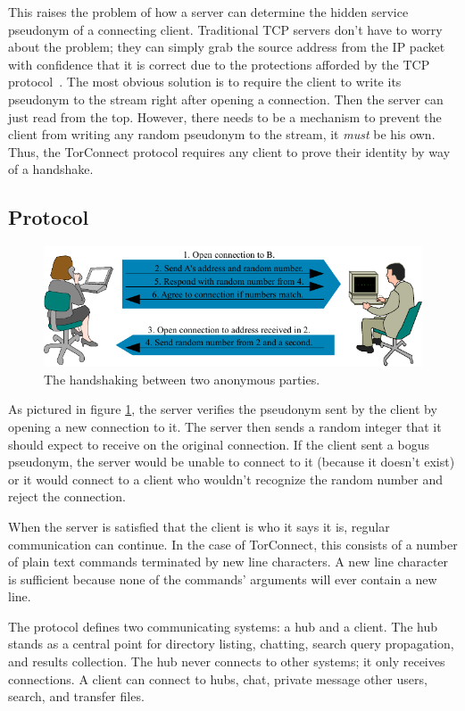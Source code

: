 \documentclass{article}
\begin{document}
This raises the problem of how a server can determine the hidden service pseudonym of a connecting client.  Traditional TCP servers don't have to worry about the problem; they can simply grab the source address from the IP packet with confidence that it is correct due to the protections afforded by the TCP protocol~\cite{wiki-spoofing}.  The most obvious solution is to require the client to write its pseudonym to the stream right after opening a connection.  Then the server can just read from the top.  However, there needs to be a mechanism to prevent the client from writing any random pseudonym to the stream, it \emph{must} be his own.  Thus, the TorConnect protocol requires any client to prove their identity by way of a handshake.

\subsection{Protocol}
\begin{figure}
\centering
\includegraphics{handshake.pdf}
\caption{The handshaking between two anonymous parties.}
\label{fig:handshake}
\end{figure}

As pictured in figure \ref{fig:handshake}, the server verifies the pseudonym sent by the client by opening a new connection to it.  The server then sends a random integer that it should expect to receive on the original connection.  If the client sent a bogus pseudonym, the server would be unable to connect to it (because it doesn't exist) or it would connect to a client who wouldn't recognize the random number and reject the connection.

When the server is satisfied that the client is who it says it is, regular communication can continue.  In the case of TorConnect, this consists of a number of plain text commands terminated by new line characters.  A new line character is sufficient because none of the commands' arguments will ever contain a new line.

The protocol defines two communicating systems: a hub and a client.  The hub stands as a central point for directory listing, chatting, search query propagation, and results collection.  The hub never connects to other systems; it only receives connections.  A client can connect to hubs, chat, private message other users, search, and transfer files.
\end{document}
